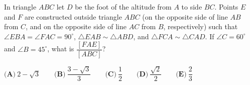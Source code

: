 In triangle $ABC$ let $D$ be the foot of the altitude from $A$ to side $BC$. Points $E$ and $F$ are constructed outside triangle $ABC$ (on the opposite side of line $AB$ from $C$, and on the opposite side of line $AC$ from $B$, respectively) such that $\angle EBA=\angle FAC=90^\circ$, $\triangle EAB\sim\triangle ABD$, and $\triangle FCA\sim\triangle CAD$. If $\angle C=60^\circ$ and $\angle B=45^\circ$, what is $\dfrac{[FAE]}{[ABC]}$?

$\textbf{(A)}\ 2-\sqrt3\qquad\textbf{(B)}\ \dfrac{3-\sqrt3}{3}\qquad\textbf{(C)}\ \dfrac{1}{2}\qquad\textbf{(D)}\ \dfrac{\sqrt2}{2}\qquad\textbf{(E)}\ \dfrac{2}{3}$
